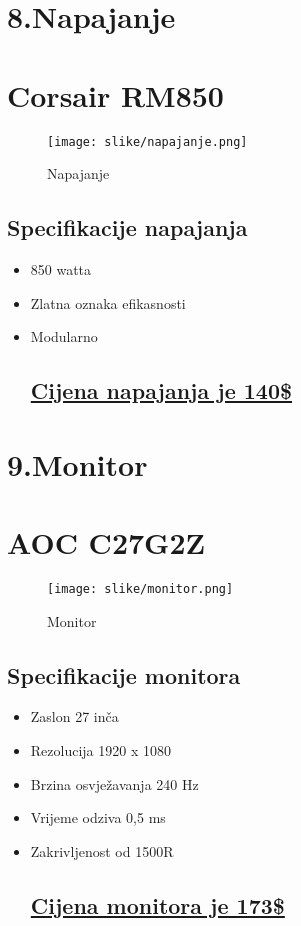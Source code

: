 \documentclass[12pt]{article}
\begin{document}
\newpage
\section*{\Huge 8.Napajanje}
\section*{\large Corsair RM850}
\begin{figure}[h]
    \centering
    \texttt{[image: slike/napajanje.png]} 
    \caption{Napajanje}
\end{figure}
\subsection*{Specifikacije napajanja}
\begin{itemize}[label=--, left=0em]
    \item 850 watta
    \item Zlatna oznaka efikasnosti
    \item Modularno
\subsection*{\href{https://www.amazon.com/dp/B093RCJRNS}{Cijena napajanja je 140\$}}
\end{itemize}

\newpage
\section*{\Huge 9.Monitor}
\section*{\large AOC C27G2Z}
\begin{figure}[h]
    \centering
    \texttt{[image: slike/monitor.png]} 
    \caption{Monitor}
\end{figure}
\subsection*{Specifikacije monitora}
\begin{itemize}[label=--, left=0em]
    \item Zaslon 27 inča
    \item Rezolucija 1920 x 1080
    \item Brzina osvježavanja 240 Hz
    \item Vrijeme odziva 0,5 ms
    \item Zakrivljenost od 1500R
\subsection*{\href{https://www.amazon.com/dp/B088LG2BSW}{Cijena monitora je 173\$}}
\end{itemize}
\end{document}

